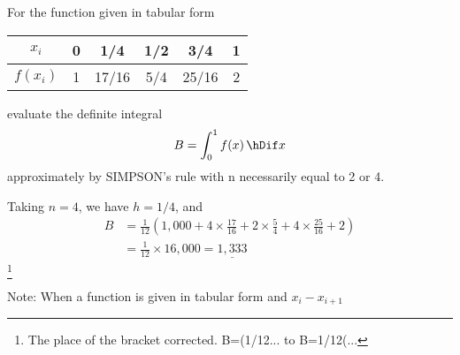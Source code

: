 \documentclass[11pt]{amsbook}
\begin{document}
\begin{exmp}
	For the function given in tabular form
	\begin{center}
		\begin{tabular}{c|ccccc}
			$x_{i}$ & 0 & 1/4 & 1/2 & 3/4 & 1 \\
			\hline
			$f(x_{i})$ & 1 & 17/16 & 5/4 & 25/16 & 2
		\end{tabular}
	\end{center}
	evaluate the definite integral
	\[
		B = \int_{0}^{1} f(x) \, \hDif x
	\]
	approximately by SIMPSON's rule with n necessarily equal to 2 or 4.
	
	\begin{hSolution}
		Taking $n=4$, we have $h=1/4$, and
		\begin{align*}
			B & = \frac{1}{12} ( 1,000+4\times\frac{17}{16} + 2 \times \frac{5}{4} + 4 \times \frac{25}{16}+2)\\
			& = \frac{1}{12} \times 16,000 = \underline{1,333}
		\end{align*}
		\footnote{The place of the bracket corrected. B=(1/12... to B=1/12(...}
	\end{hSolution}
\end{exmp}
Note: When a function is given in tabular form and $x_{i}-x_{i+1}$


\end{document}
